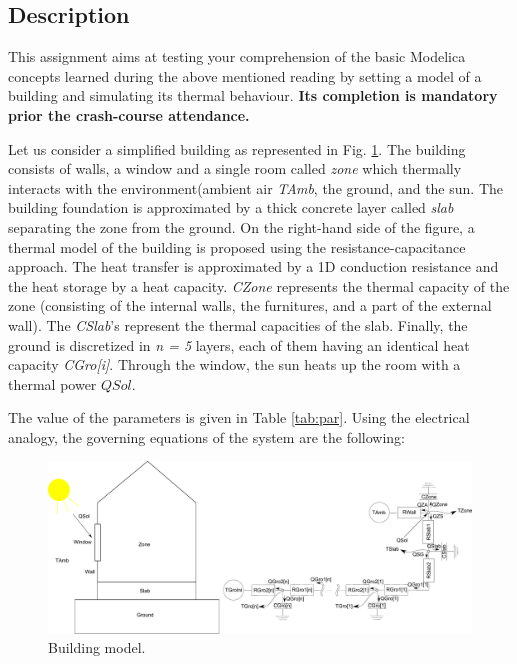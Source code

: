 \documentclass[10pt,a4paper]{article}
\begin{document}
\subsection*{Description}
This assignment aims at testing your comprehension of the basic Modelica concepts learned during the above mentioned reading by setting a model of a building and simulating its thermal behaviour. \textbf{Its completion is mandatory prior the crash-course attendance.}

Let us consider a simplified building as represented in Fig. \ref{fig:bui}. The building consists of  walls, a window and a single room called \textit{zone} which thermally interacts with the environment(ambient air \textit{TAmb}, the ground, and the sun. The building foundation is approximated by a thick concrete layer called \textit{slab} separating the zone from the ground. On the right-hand side of the figure, a thermal model of the building is proposed using the resistance-capacitance approach. The heat transfer is approximated by a 1D conduction resistance and the heat storage by a heat capacity. \textit{CZone} represents the thermal capacity of the zone (consisting of the internal walls, the furnitures, and a part of the external wall). The \textit{CSlab}'s represent the thermal capacities of the slab. Finally, the ground is discretized in \textit{n = 5} layers, each of them having an identical heat capacity \textit{CGro[i]}. Through the window, the sun heats up the room with a thermal power $QSol$. 

The value of the parameters is given in Table \ref{tab:par}. Using the electrical analogy, the governing equations of the system are the following:

\begin{figure}[hbtp] 
	\centering
	\includegraphics[width=1 \textwidth]{images/RCModelHouse.pdf}
	\caption{ Building model.}
	\label{fig:bui}
\end{figure}
\end{document}
